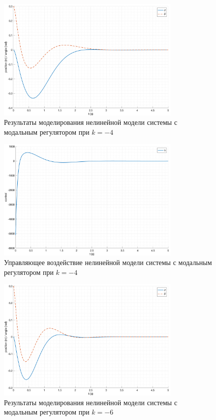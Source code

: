 \begin{figure}[ht!]
    \centering
    \includegraphics[width=0.8\textwidth]{media/plots/modal_controllers/out_1.png}
    \caption{Результаты моделирования нелинейной модели системы с модальным регулятором при $k = -4$}
    \label{fig:modal_controlers_1_out}
\end{figure}
\begin{figure}[ht!]
    \centering
    \includegraphics[width=0.8\textwidth]{media/plots/modal_controllers/u_1.png}
    \caption{Управляющее воздействие нелинейной модели системы с модальным регулятором при $k = -4$}
    \label{fig:modal_controlers_1_u}
\end{figure}
\begin{figure}[ht!]
    \centering
    \includegraphics[width=0.8\textwidth]{media/plots/modal_controllers/out_2.png}
    \caption{Результаты моделирования нелинейной модели системы с модальным регулятором при $k = -6$}
    \label{fig:modal_controlers_2_out}
\end{figure}
